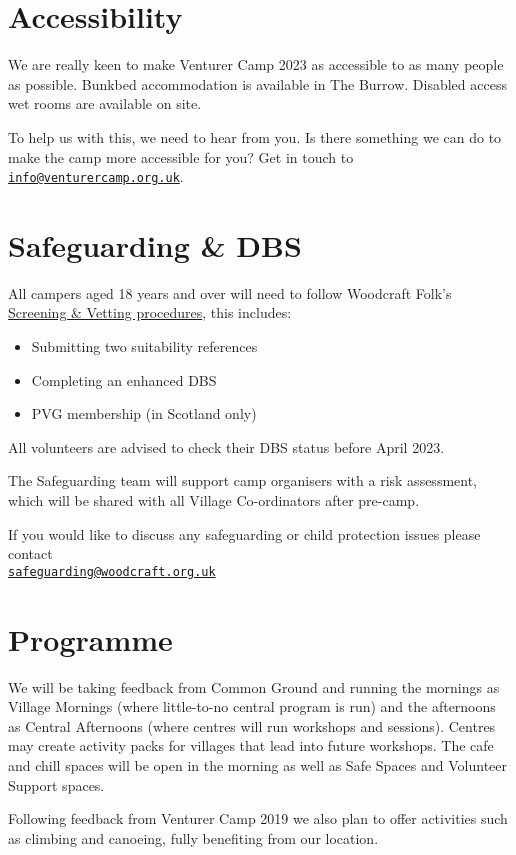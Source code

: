 \documentclass[a4paper, 10pt]{report}
\begin{document}
\chapter{Accessibility}
We are really keen to make Venturer Camp 2023 as accessible to as many people as possible. Bunkbed accommodation is available in The Burrow. Disabled access wet rooms are available on site.

To help us with this, we need to hear from you. Is there something we can do to make the camp more accessible for you? Get in touch to \href{mailto:info@venturercamp.org.uk}{\texttt{info@venturercamp.org.uk}}.

\chapter{Safeguarding \& DBS}
All campers aged 18 years and over will need to follow Woodcraft Folk's \href{https://woodcraft.org.uk/resources/volunteer-screening/}{Screening \& Vetting procedures}, this includes:
\begin{itemize}
    \item Submitting two suitability references
    \item Completing an enhanced DBS
    \item PVG membership (in Scotland only)
\end{itemize}
All volunteers are advised to check their DBS status before April 2023.

The Safeguarding team will support camp organisers with a risk assessment, which will be shared with all Village Co-ordinators after pre-camp.

If you would like to discuss any safeguarding or child protection issues please contact\\ \href{mailto:safeguarding@woodcraft.org.uk}{\texttt{safeguarding@woodcraft.org.uk}}

\chapter{Programme}
We will be taking feedback from Common Ground and running the mornings as Village Mornings (where little-to-no central program is run) and the afternoons as Central Afternoons (where centres will run workshops and sessions). Centres may create activity packs for villages that lead into future workshops. The cafe and chill spaces will be open in the morning as well as Safe Spaces and Volunteer Support spaces. 

Following feedback from Venturer Camp 2019 we also plan to offer activities such as climbing and canoeing, fully benefiting from our location. 
\end{document}
